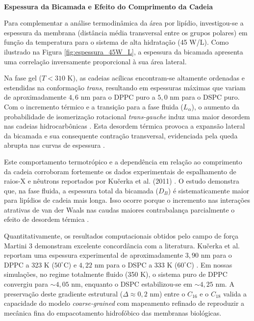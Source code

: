 \

\vspace{1em}
\noindent\textbf{Espessura da Bicamada e Efeito do Comprimento da Cadeia }

Para complementar a análise termodinâmica da área por lipídio, investigou-se a espessura da membrana (distância média transversal entre os grupos polares) em função da temperatura para o sistema de alta hidratação (45 W/L). Como ilustrado na Figura \ref{fig:espessura_45W_L}, a espessura da bicamada apresenta uma correlação inversamente proporcional à sua área lateral. 

Na fase gel ($T < 310$ K), as cadeias acílicas encontram-se altamente ordenadas e estendidas na conformação \textit{trans}, resultando em espessuras máximas que variam de aproximadamente $4,6$ nm para o DPPC puro a $5,0$ nm para o DSPC puro. Com o incremento térmico e a transição para a fase fluida ($L_\alpha$), o aumento da probabilidade de isomerização rotacional \textit{trans-gauche} induz uma maior desordem nas cadeias hidrocarbônicas \cite{kucerka2011}. Esta desordem térmica provoca a expansão lateral da bicamada e sua consequente contração transversal, evidenciada pela queda abrupta nas curvas de espessura \cite{kucerka2011}.

Este comportamento termotrópico e a dependência em relação ao comprimento da cadeia corroboram fortemente os dados experimentais de espalhamento de raios-X e nêutrons reportados por Ku\v{c}erka et al. (2011) \cite{kucerka2011}. O estudo demonstra que, na fase fluida, a espessura total da bicamada ($D_B$) é sistematicamente maior para lipídios de cadeia mais longa. Isso ocorre porque o incremento nas interações atrativas de van der Waals nas caudas maiores contrabalança parcialmente o efeito de desordem térmica \cite{kucerka2011}.

Quantitativamente, os resultados computacionais obtidos pelo campo de força Martini 3 demonstram excelente concordância com a literatura. Ku\v{c}erka et al. reportam uma espessura experimental de aproximadamente $3,90$ nm para o DPPC a 323 K ($50^\circ$C) e $4,22$ nm para o DSPC a 333 K ($60^\circ$C) \cite{kucerka2011}. Em nossas simulações, no regime totalmente fluido (350 K), o sistema puro de DPPC convergiu para $\sim 4,05$ nm, enquanto o DSPC estabilizou-se em $\sim 4,25$ nm. A preservação deste gradiente estrutural ($\Delta \approx 0,2$ nm) entre o $C_{16}$ e o $C_{18}$ valida a capacidade do modelo \textit{coarse-grained} com mapeamento refinado de reproduzir a mecânica fina do empacotamento hidrofóbico das membranas biológicas.

